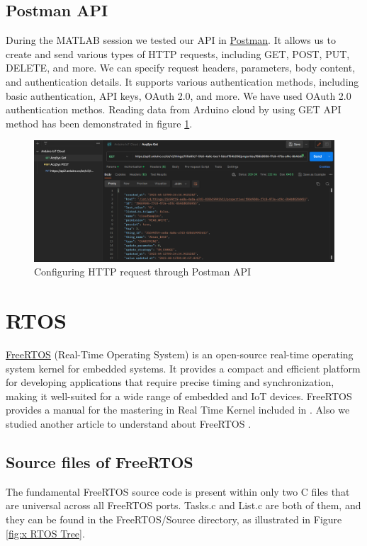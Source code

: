 \subsection{Postman API}
During the MATLAB session we tested our API in \href{https://www.postman.com/}{Postman}. It allows us to create and send various types of HTTP requests, including GET, POST, PUT, DELETE, and more. We can specify request headers, parameters, body content, and authentication details. It supports various authentication methods, including basic authentication, API keys, OAuth 2.0, and more. We have used OAuth 2.0 authentication methos. Reading data from Arduino cloud by using GET API method has been demonstrated in figure \ref{fig:x Postman}.
\begin{figure}[htbp]
\centering
\includegraphics[scale=0.460]{images/postman.png} 
\caption{Configuring HTTP request through Postman API}
\label{fig:x Postman}
\end{figure}
\section{RTOS} 
\href{https://freertos.org/}{FreeRTOS} (Real-Time Operating System) is an open-source real-time operating system kernel for embedded systems. It provides a compact and efficient platform for developing applications that require precise timing and synchronization, making it well-suited for a wide range of embedded and IoT devices. FreeRTOS provides a manual for the mastering in Real Time Kernel included in \cite{FreeRTOS}. Also we studied another article to understand about FreeRTOS \cite{UnderstandingRTOS}. 

\subsection{Source files of FreeRTOS}
The fundamental FreeRTOS source code is present within only two C files that are universal across all FreeRTOS ports.  Tasks.c and List.c are both of them, and they can be found in the FreeRTOS/Source directory, as illustrated in Figure \ref{fig:x RTOS Tree}. 

